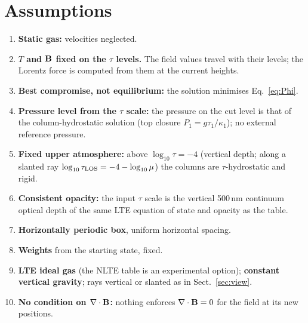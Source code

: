 \section{Assumptions}\label{sec:assume}
\begin{enumerate}[label=\textbf{A\arabic*.},leftmargin=2.2em]
\item \textbf{Static gas:} velocities neglected.
\item \textbf{$T$ and $\mathbf B$ fixed on the $\tau$ levels.} The field values travel with their levels; the Lorentz force is computed
from them at the current heights.
\item \textbf{Best compromise, not equilibrium:} the solution minimises Eq.~\eqref{eq:Phi}.
\item \textbf{Pressure level from the $\tau$ scale:} the pressure on the cut level is that of the column-hydrostatic solution
(top closure $P_1=g\tau_1/\kappa_1$); no external reference pressure.
\item \textbf{Fixed upper atmosphere:} above $\log_{10}\tau=-4$ (vertical depth; along a slanted ray $\log_{10}\tau_{\rm LOS}=
-4-\log_{10}\mu$) the columns are $\tau$-hydrostatic and rigid.
\item \textbf{Consistent opacity:} the input $\tau$ scale is the vertical 500\,nm continuum optical depth of the same LTE
equation of state and opacity as the table.
\item \textbf{Horizontally periodic box}, uniform horizontal spacing.
\item \textbf{Weights} from the starting state, fixed.
\item \textbf{LTE ideal gas} (the NLTE table is an experimental option); \textbf{constant vertical gravity}; rays vertical
or slanted as in Sect.~\ref{sec:view}.
\item \textbf{No condition on $\nabla\cdot\mathbf B$:} nothing enforces $\nabla\cdot\mathbf B=0$ for the field at its new positions.
\end{enumerate}

